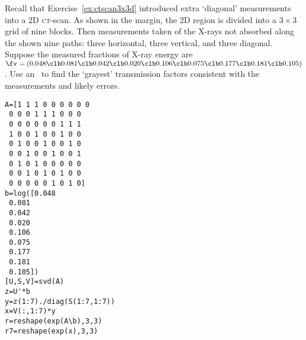 \begin{example} \label{eg:ctscan3x3d2}
Recall that Exercise~\ref{ex:ctscan3x3d} introduced extra `diagonal' measurements into a 2D \textsc{ct}-scan.
As shown in the margin, the 2D region is divided into a \(3\times3\) grid of nine blocks.
Then measurements taken of the X-rays not absorbed along the shown nine paths: three horizontal, three vertical, and three diagonal.
Suppose the measured fractions of X-ray energy are \(\fv=(0.048\clb 0.081\clb 0.042\clb 0.020\clb 0.106\clb 0.075\clb 0.177\clb 0.181\clb 0.105)\).
Use an \svd\ to find the `grayest' transmission factors consistent with the measurements and likely errors.
\begin{verbatim}
A=[1 1 1 0 0 0 0 0 0 
 0 0 0 1 1 1 0 0 0 
 0 0 0 0 0 0 1 1 1
 1 0 0 1 0 0 1 0 0 
 0 1 0 0 1 0 0 1 0 
 0 0 1 0 0 1 0 0 1 
 0 1 0 1 0 0 0 0 0
 0 0 1 0 1 0 1 0 0
 0 0 0 0 0 1 0 1 0]
b=log([0.048
 0.081
 0.042
 0.020
 0.106
 0.075
 0.177
 0.181
 0.105])
[U,S,V]=svd(A)
z=U'*b
y=z(1:7)./diag(S(1:7,1:7))
x=V(:,1:7)*y
r=reshape(exp(A\b),3,3)
r7=reshape(exp(x),3,3)
\end{verbatim}


\end{example}
